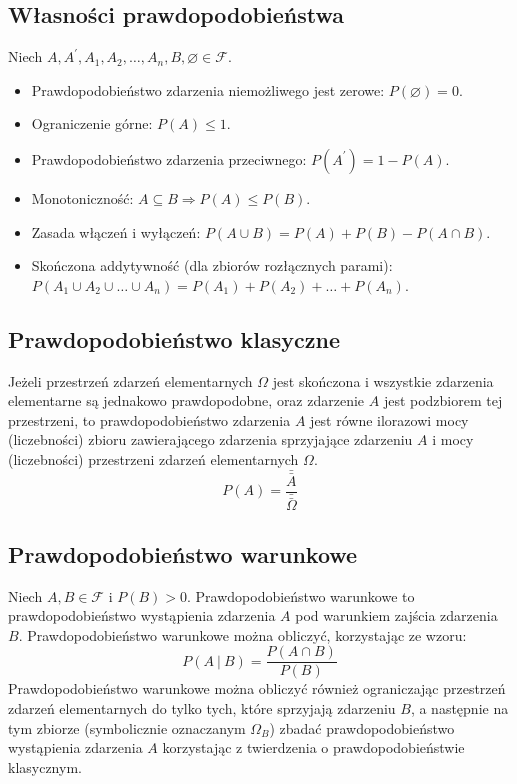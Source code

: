 \documentclass[14pt,a4paper]{extarticle}
\begin{document}
\subsection{Własności prawdopodobieństwa}
\noindent Niech $A, A^{\prime}, A_{1}, A_{2}, \ldots, A_{n}, B, \varnothing \in \mathcal{F}$.
\begin{itemize}
   \item Prawdopodobieństwo zdarzenia niemożliwego jest zerowe: $P(\varnothing) = 0$.
   \item Ograniczenie górne: $P(A) \leq 1$.
   \item Prawdopodobieństwo zdarzenia przeciwnego: $P(A^{\prime}) = 1 - P(A)$.
   \item Monotoniczność: $A \subseteq B \Rightarrow P(A) \leq P(B)$.
   \item Zasada włączeń i wyłączeń: $P(A\cup B) = P(A) + P(B) - P(A \cap B)$.
   \item Skończona addytywność (dla zbiorów rozłącznych parami):\\
   $P(A_{1}\cup A_{2}\cup \ldots \cup A_{n}) = P(A_{1}) + P(A_{2}) + \ldots + P(A_{n})$. 
\end{itemize}

\subsection{Prawdopodobieństwo klasyczne}
Jeżeli przestrzeń zdarzeń elementarnych $\Omega$ jest skończona i wszystkie zdarzenia elementarne
są jednakowo prawdopodobne, oraz zdarzenie $A$ jest podzbiorem tej przestrzeni, to prawdopodobieństwo
zdarzenia $A$ jest równe ilorazowi mocy (liczebności) zbioru zawierającego zdarzenia sprzyjające
zdarzeniu $A$ i mocy (liczebności) przestrzeni zdarzeń elementarnych $\Omega$.
$$P(A) = \dfrac{\bar{\bar{A}}}{\bar{\bar{\Omega}}}$$


\subsection{Prawdopodobieństwo warunkowe}
Niech $A, B \in \mathcal{F}$ i $P(B) > 0$.
Prawdopodobieństwo warunkowe to prawdopodobieństwo wystąpienia zdarzenia $A$ pod warunkiem zajścia zdarzenia $B$.
Prawdopodobieństwo warunkowe można obliczyć, korzystając ze wzoru:
\[P(A\:\vert\: B) = \dfrac{P(A \cap B)}{P(B)}\]
Prawdopodobieństwo warunkowe można obliczyć również ograniczając przestrzeń zdarzeń elementarnych
do tylko tych, które sprzyjają zdarzeniu $B$, a następnie na tym zbiorze (symbolicznie oznaczanym $\Omega_{B}$)
zbadać prawdopodobieństwo wystąpienia zdarzenia $A$ korzystając z twierdzenia o prawdopodobieństwie klasycznym.\\\\
\end{document}
